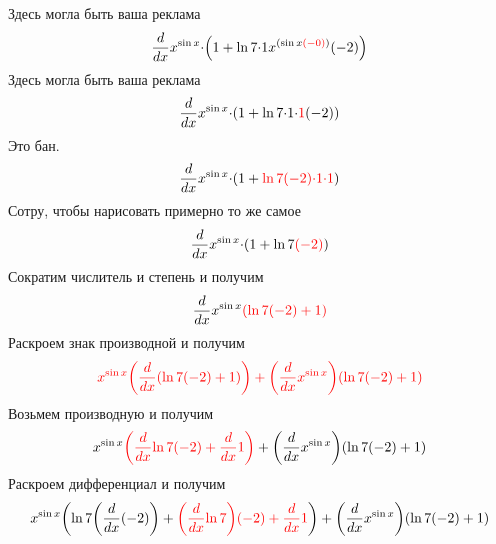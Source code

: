 \documentclass{article}
\begin{document}
\begin{center}
Здесь могла быть ваша реклама\begin{gather*}
{{\frac{{d}}{{d{{x}}}}}{{{{x}^{\sin{{x}}}}{\cdot}{\left({1}+{{\ln{{7}}}{\cdot}{{1}{{{x}^{\left({\sin{{x}}}{\color{red}{{\left(-{0}\right)}}}\right)}}{\left(-{2}\right)}}}}\right)}}}}\end{gather*}
Здесь могла быть ваша реклама\begin{gather*}
{{\frac{{d}}{{d{{x}}}}}{{{{x}^{\sin{{x}}}}{\cdot}{\left({1}+{{\ln{{7}}}{\cdot}{{1}{\cdot}{{\color{red}{{1}}}{\left(-{2}\right)}}}}\right)}}}}\end{gather*}
Это бан.\begin{gather*}
{{\frac{{d}}{{d{{x}}}}}{{{{x}^{\sin{{x}}}}{\cdot}{\left({1}+{\color{red}{{{\ln{{7}}}{{\left(-{2}\right)}{\cdot}{{1}{\cdot}{1}}}}}}\right)}}}}\end{gather*}
Сотру, чтобы нарисовать примерно то же самое\begin{gather*}
{{\frac{{d}}{{d{{x}}}}}{{{{x}^{\sin{{x}}}}{\cdot}{\left({1}+{{\ln{{7}}}{\color{red}{{\left(-{2}\right)}}}}\right)}}}}\end{gather*}
Сократим числитель и степень и получим\begin{gather*}
{{\frac{{d}}{{d{{x}}}}}{{{{x}^{\sin{{x}}}}{\color{red}{{\left({{\ln{{7}}}{\left(-{2}\right)}}+{1}\right)}}}}}}\end{gather*}
Раскроем знак производной и получим\begin{gather*}
{\color{red}{{{{{x}^{\sin{{x}}}}{\left({\frac{{d}}{{d{{x}}}}}{{\left({{\ln{{7}}}{\left(-{2}\right)}}+{1}\right)}}\right)}}+{{\left({\frac{{d}}{{d{{x}}}}}{{{x}^{\sin{{x}}}}}\right)}{\left({{\ln{{7}}}{\left(-{2}\right)}}+{1}\right)}}}}}\end{gather*}
Возьмем производную и получим\begin{gather*}
{{{{x}^{\sin{{x}}}}{\color{red}{{\left({{\frac{{d}}{{d{{x}}}}}{{{\ln{{7}}}{\left(-{2}\right)}}}}+{{\frac{{d}}{{d{{x}}}}}{{1}}}\right)}}}}+{{\left({\frac{{d}}{{d{{x}}}}}{{{x}^{\sin{{x}}}}}\right)}{\left({{\ln{{7}}}{\left(-{2}\right)}}+{1}\right)}}}\end{gather*}
Раскроем дифференциал и получим\begin{gather*}
{{{{x}^{\sin{{x}}}}{\left({{\ln{{7}}}{\left({\frac{{d}}{{d{{x}}}}}{{\left(-{2}\right)}}\right)}}+{\color{red}{{{{\left({\frac{{d}}{{d{{x}}}}}{{\ln{{7}}}}\right)}{\left(-{2}\right)}}+{{\frac{{d}}{{d{{x}}}}}{{1}}}}}}\right)}}+{{\left({\frac{{d}}{{d{{x}}}}}{{{x}^{\sin{{x}}}}}\right)}{\left({{\ln{{7}}}{\left(-{2}\right)}}+{1}\right)}}}\end{gather*}

\end{center}
\end{document}
